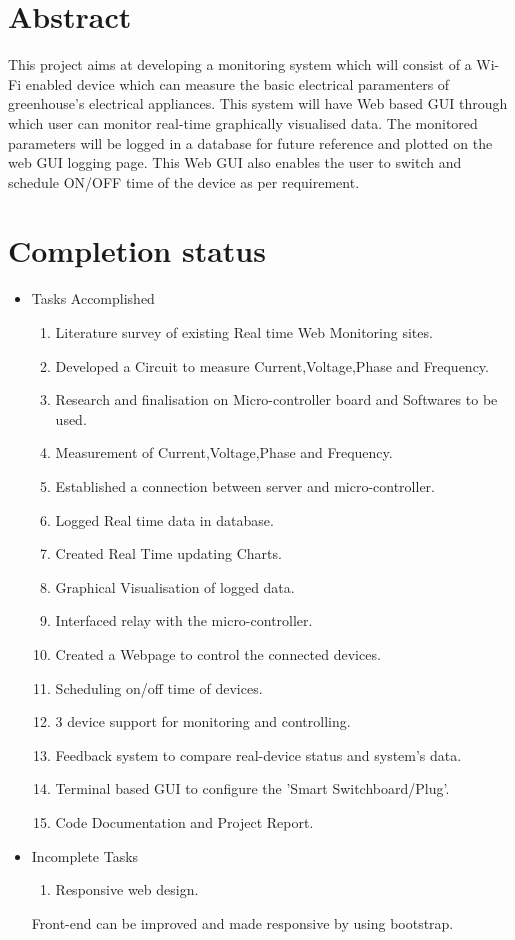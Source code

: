 \documentclass[a4paper,12pt,oneside]{book}
\begin{document}
\section{Abstract}
\hspace{7mm}This project aims at developing a monitoring system which will consist of a Wi-Fi enabled device which can measure the basic electrical paramenters of greenhouse's electrical appliances. This system will have Web based GUI through which user can monitor real-time graphically visualised data. 
The monitored parameters will be logged in a database for future reference and  plotted on the web GUI logging page. This Web GUI also enables the user to switch and schedule ON/OFF time of the device as per requirement.
\\

\newpage

\section{Completion status}
\begin{itemize}
	\item{Tasks Accomplished}
	\setlength\itemsep{0.2cm}
	\begin{enumerate}
		\item{Literature survey of existing Real time Web Monitoring sites. }    
		\item{Developed a Circuit to measure Current,Voltage,Phase and Frequency.}
		\item{Research and finalisation on Micro-controller board and Softwares to be used.}
		\item{Measurement of Current,Voltage,Phase and Frequency.}
		\item{Established a connection between server and micro-controller.}
		\item{Logged Real time data in database.}
		\item{Created Real Time updating Charts.}
		\item{Graphical Visualisation of logged data.}
		\item{Interfaced relay with the micro-controller.}
		\item{Created a Webpage to control the connected devices.}
		\item{Scheduling on/off time of devices.}
		\item{3 device support for monitoring and controlling.}
		\item{Feedback system to compare real-device status and system's  data.}
		\item{Terminal based GUI to configure the 'Smart Switchboard/Plug'.}
		\item{Code Documentation and Project Report.}
	\end{enumerate}
	\item{Incomplete Tasks}
	\begin{enumerate}
		\item{Responsive web design. }
	\end{enumerate}
	\par Front-end can be improved and made responsive by using bootstrap.   
\end{itemize}
\end{document}
